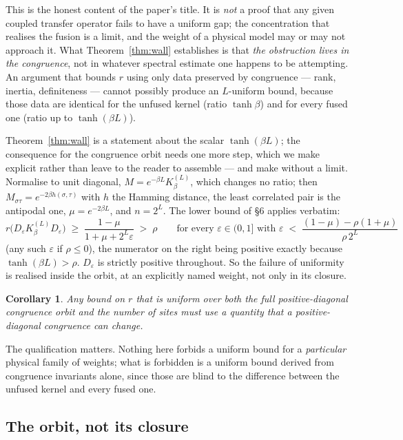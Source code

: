 \documentclass[11pt,a4paper]{article}
\theoremstyle{plain}
\newtheorem{corollary}[theorem]{Corollary}
\theoremstyle{definition}
\begin{document}
This is the honest content of the paper's title. It is \emph{not} a proof that
any given coupled transfer operator fails to have a uniform gap; the
concentration that realises the fusion is a limit, and the weight of a physical
model may or may not approach it. What Theorem~\ref{thm:wall} establishes is
that \emph{the obstruction lives in the congruence}, not in whatever spectral
estimate one happens to be attempting. An argument that bounds $r$ using only
data preserved by congruence --- rank, inertia, definiteness --- cannot
possibly produce an $L$-uniform bound, because those data are identical for the
unfused kernel (ratio $\tanh\beta$) and for every fused one (ratio up to
$\tanh(\beta L)$).

Theorem~\ref{thm:wall} is a statement about the scalar $\tanh(\beta L)$; the
consequence for the congruence orbit needs one more step, which we make explicit
rather than leave to the reader to assemble --- and make without a limit.
Normalise to unit diagonal, $M=e^{-\beta L}K^{(L)}_\beta$, which changes no
ratio; then $M_{\sigma\tau}=e^{-2\beta h(\sigma,\tau)}$ with $h$ the Hamming
distance, the least correlated pair is the antipodal one,
$\mu=e^{-2\beta L}$, and $n=2^L$. The lower bound of \S6 applies verbatim:
\[
  r\big(D_\varepsilon K^{(L)}_\beta D_\varepsilon\big)
   \;\ge\;\frac{1-\mu}{1+\mu+2^{L}\varepsilon}\;>\;\rho
  \qquad\text{for every }\varepsilon\in(0,1]\text{ with }
  \varepsilon\;<\;\frac{(1-\mu)-\rho(1+\mu)}{\rho\,2^{L}}
\]
(any such $\varepsilon$ if $\rho\le0$), the numerator on the right being
positive exactly because $\tanh(\beta L)>\rho$. $D_\varepsilon$ is strictly
positive throughout. So the failure of uniformity is realised inside the orbit,
at an explicitly named weight, not only in its closure.

\begin{corollary}
Any bound on $r$ that is uniform over both the full positive-diagonal congruence
orbit and the number of sites must use a quantity that a positive-diagonal
congruence can change.
\end{corollary}

The qualification matters. Nothing here forbids a uniform bound for a
\emph{particular} physical family of weights; what is forbidden is a uniform
bound derived from congruence invariants alone, since those are blind to the
difference between the unfused kernel and every fused one.

\subsection*{The orbit, not its closure}
\end{document}
